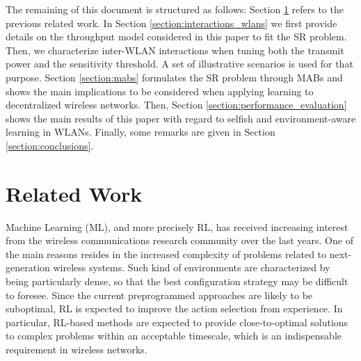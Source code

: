 \documentclass[preprint,12pt]{elsarticle}
\begin{document}
The remaining of this document is structured as follows: Section \ref{section:previous_work} refers to the previous related work. In Section \ref{section:interactions_wlans} we first provide details on the throughput model considered in this paper to fit the SR problem. Then, we characterize inter-WLAN interactions when tuning both the transmit power and the sensitivity threshold. A set of illustrative scenarios is used for that purpose. Section \ref{section:mabs} formulates the SR problem through MABs and shows the main implications to be considered when applying learning to decentralized wireless networks. Then, Section \ref{section:performance_evaluation} shows the main results of this paper with regard to selfish and environment-aware learning in WLANs. Finally, some remarks are given in Section \ref{section:conclusions}.

\section{Related Work}
\label{section:previous_work} 		
Machine Learning (ML), and more precisely RL, has received increasing interest from the wireless communications research community over the last years. One of the main reasons resides in the increased complexity of problems related to next-generation wireless systems. Such kind of environments are characterized by being particularly dense, so that the best configuration strategy may be difficult to foresee. Since the current preprogrammed approaches are likely to be suboptimal, RL is expected to improve the action selection from experience. In particular, RL-based methods are expected to provide close-to-optimal solutions to complex problems within an acceptable timescale, which is an indispensable requirement in wireless networks.
\end{document}
